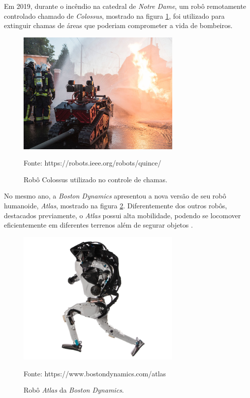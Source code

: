 Em 2019, durante o incêndio na catedral de \textit{Notre Dame}, um robô remotamente controlado chamado de \textit{Colossus}, mostrado na figura \ref{fig:colossus2019}, foi utilizado para extinguir chamas de áreas que poderiam comprometer a vida de bombeiros\cite{colossus2019}.

 \begin{figure}[h]  
        \centering
        \caption{Robô \textit{}{Colossus} utilizado no controle de chamas.}
        \includegraphics[width=8cm]{./figs/colossus2019.jpg}
        \par\medskip
Fonte: https://robots.ieee.org/robots/quince/
        \label{fig:colossus2019}
\end{figure}


No mesmo ano, a \textit{Boston Dynamics} apresentou a nova versão de seu robô humanoide, \textit{Atlas}, mostrado na figura \ref{fig:atlas}. Diferentemente dos outros robôs, destacados previamente, o \textit{Atlas} possui alta mobilidade, podendo se locomover eficientemente em diferentes terrenos além de segurar objetos \cite{atlas}.

 \begin{figure}[H]  
        \centering
        \caption{Robô \textit{Atlas} da \textit{Boston Dynamics}.}
        \includegraphics[width=8cm]{./figs/atlas.png}
        \par\medskip
Fonte: https://www.bostondynamics.com/atlas
        \label{fig:atlas}
\end{figure}

